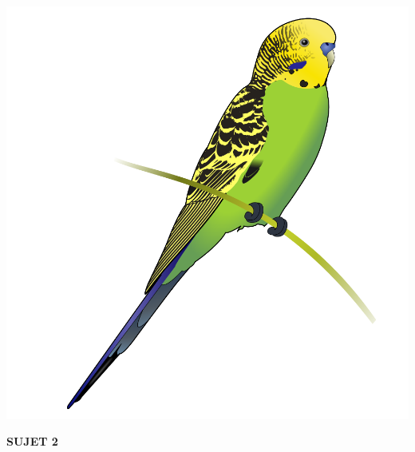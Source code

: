 \documentclass[11pt,a4paper]{article}
\begin{document}
\vfillFirst

\begin{center}
\includegraphics[scale=0.2]{img/others/Budgerigar_diagram.png}
\end{center}

\vfillLast


\newpage



\vfillFirst

\begin{center}

\begin{LARGE}
\textbf{SUJET 2}
\end{LARGE}

\end{center}

\vfillLast
\end{document}
